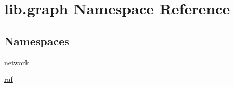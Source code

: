 \hypertarget{a00111}{\section{lib.\-graph Namespace Reference}
\label{a00111}
}
\subsection*{Namespaces}
\begin{DoxyCompactItemize}
\item 
\hyperlink{a00112}{network}
\item 
\hyperlink{a00113}{raf}
\end{DoxyCompactItemize}
